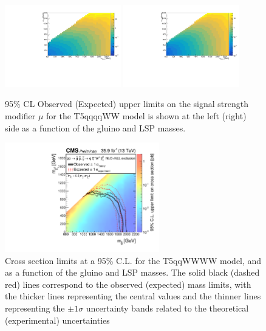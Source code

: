 \begin{figure}[!hb]
\centering
  \includegraphics[width=0.45\textwidth]{Plots/analysis/results/ObsLim}
 \includegraphics[width=0.45\textwidth]{Plots/analysis/results/ExpLim}
  \caption{ 95\% CL Observed (Expected) upper limits on the signal strength modifier $\mu$ for the T5qqqqWW model is shown at the left (right) side as a function of the gluino and LSP masses.
  }
  \label{fig:uplims}
\end{figure}

\begin{figure}[!hb]
\centering
  \includegraphics[width=0.6\textwidth]{Plots/analysis/results/CMS-PAS-SUS-16-042_Figure_004-b.pdf}
  \caption{ Cross section limits at a 95\% C.L. for the T5qqWWWW model, and as a function of the gluino and LSP masses. The solid black (dashed red) lines correspond to the observed (expected) mass limits, with the
  thicker lines representing the central values and the thinner lines
representing the $\pm 1\sigma$ uncertainty bands related to the theoretical
(experimental) uncertainties
  }
  \label{fig:FinalLim}
\end{figure}

